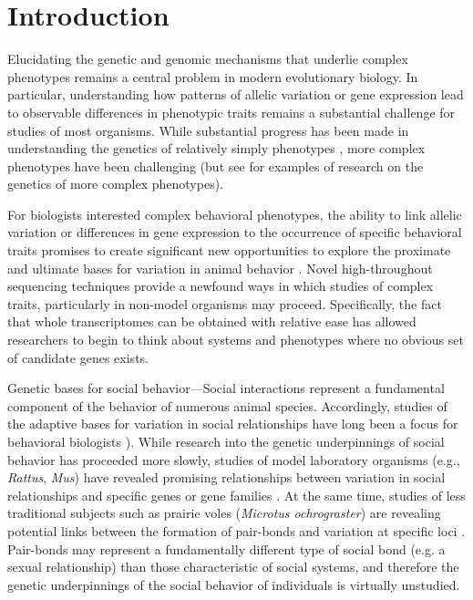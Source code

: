 \documentclass[10.5pt]{article}
\begin{document}
\doublespacing
\linenumbers


\vspace{12mm}

\section*{Introduction}
\hspace{4mm} Elucidating the genetic and genomic mechanisms that underlie complex phenotypes remains a central problem in modern evolutionary biology. In particular, understanding how patterns of allelic variation or gene expression lead to observable differences in phenotypic traits remains a substantial challenge for studies of most organisms. While substantial progress has been made in understanding the genetics of relatively simply phenotypes \citep{Rosenblum:2009ih,Steiner:2007fi}, more complex phenotypes have been challenging (but see \citet{Weber:2009em,Shapiro:2013ce} for examples of research on the genetics of more complex phenotypes). 

For biologists interested complex behavioral phenotypes, the ability to link allelic variation or differences in gene expression to the occurrence of specific behavioral traits promises to create significant new opportunities to explore the proximate and ultimate bases for variation in animal behavior \citep{Blumstein:2010gs}.  Novel high-throughout sequencing techniques provide a newfound ways in which studies of complex traits, particularly in non-model organisms may proceed.  Specifically, the fact that whole transcriptomes can be obtained with relative ease has allowed researchers to begin to think about systems and phenotypes where no obvious set of candidate genes exists.   

Genetic bases for social behavior---Social interactions represent a fundamental component of the behavior of numerous animal species. Accordingly, studies of the adaptive bases for variation in social relationships have long been a focus for behavioral biologists \citep{Alexander:1974va, Allaine:2000uk, Nonacs:2000wa, Fjerdingstad:2006ud, Ebensperger:2008ef}). While research into the genetic underpinnings of social behavior has proceeded more slowly, studies of model laboratory organisms (e.g., \textit{Rattus}, \textit{Mus}) have revealed promising relationships between variation in social relationships and specific genes or gene families \citep{Drew:2007hd, Miyakawa:2003gw, SustkovaFiserova:2009um}. At the same time, studies of less traditional subjects such as prairie voles (\textit{Microtus ochrograster}) are revealing potential links between the formation of pair-bonds and variation at specific loci \citep{Young:1999we, Donaldson:2008cn, Heckel:2008wg}. Pair-bonds may represent a fundamentally different type of social bond (e.g. a sexual relationship) than those characteristic of social systems, and therefore the genetic underpinnings of the social behavior of individuals is virtually unstudied.
\end{document}
